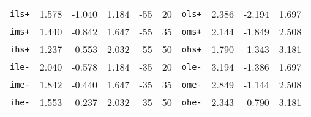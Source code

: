 \begin{tabular}{rrrrrrrrrr}
\verb|ils+| & 1.578 & -1.040 & 1.184 & -55 & 20 & \verb|ols+| & 2.386 & -2.194 & 1.697\\
\verb|ims+| & 1.440 & -0.842 & 1.647 & -55 & 35 & \verb|oms+| & 2.144 & -1.849 & 2.508\\
\verb|ihs+| & 1.237 & -0.553 & 2.032 & -55 & 50 & \verb|ohs+| & 1.790 & -1.343 & 3.181\\
\verb|ile-| & 2.040 & -0.578 & 1.184 & -35 & 20 & \verb|ole-| & 3.194 & -1.386 & 1.697\\
\verb|ime-| & 1.842 & -0.440 & 1.647 & -35 & 35 & \verb|ome-| & 2.849 & -1.144 & 2.508\\
\verb|ihe-| & 1.553 & -0.237 & 2.032 & -35 & 50 & \verb|ohe-| & 2.343 & -0.790 & 3.181\\
\bottomrule
\end{tabular}
